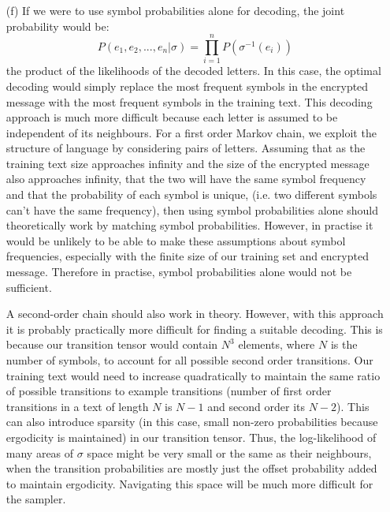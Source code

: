 \documentclass[12pt]{article}
\begin{document}
\begin{enumerate}
\item[(f)] If we were to use symbol probabilities alone for decoding, the joint probability would be:
$$P(e_1, e_2,...,e_n|\sigma) = \prod_{i=1}^n P(\sigma^{-1}(e_i))$$
the product of the likelihoods of the decoded letters. In this case, the optimal decoding would simply replace the most frequent symbols in the encrypted message with the most frequent symbols in the training text. This decoding approach is much more difficult because each letter is assumed to be independent of its neighbours. For a first order Markov chain, we exploit the structure of language by considering pairs of letters. Assuming that as the training text size approaches infinity and the size of the encrypted message also approaches infinity, that the two will have the same symbol frequency and that the probability of each symbol is unique, (i.e. two different symbols can't have the same frequency), then using symbol probabilities alone should theoretically work by matching symbol probabilities. However, in practise it would be unlikely to be able to make these assumptions about symbol frequencies, especially with the finite size of our training set and encrypted message. Therefore in practise, symbol probabilities alone would not be sufficient.

A second-order chain should also work in theory. However, with this approach it is probably practically more difficult for finding a suitable decoding. This is because our transition tensor would contain $N^3$ elements, where $N$ is the number of symbols, to account for all possible second order transitions. Our training text would need to increase quadratically to maintain the same ratio of possible transitions to example transitions (number of first order transitions in a text of length $N$ is $N-1$ and second order its $N-2$). This can also introduce sparsity (in this case, small non-zero probabilities because ergodicity is maintained) in our transition tensor. Thus, the log-likelihood of many areas of $\sigma$ space might be very small or the same as their neighbours, when the transition probabilities are mostly just the offset probability added to maintain ergodicity. Navigating this space will be much more difficult for the sampler.


\end{enumerate}
\end{document}
